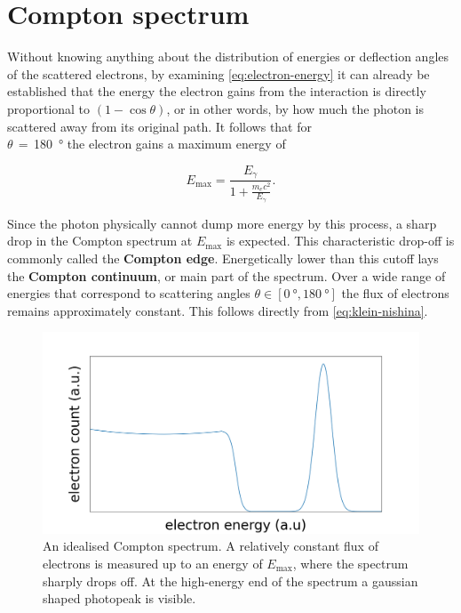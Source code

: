 
\section{Compton spectrum}
\label{sec:compton-spectrum}

Without knowing anything about the distribution of energies or deflection angles of
the scattered electrons, by examining \autoref{eq:electron-energy} it can already be
established that the energy the electron gains from the interaction is directly
proportional to $\left(1-\cos\theta\right)$, or in other words, by how much the
photon is scattered away from its original path. It follows that for \\
$\theta\,=\,$\SI{180}{\degree} the electron gains a maximum energy of

\begin{equation}
\label{eq:maximal-energy}
E_\text{max}=\frac{E_\gamma}{1+\frac{m_e c^2}{E_\gamma}}.
\end{equation}

Since the photon physically cannot dump more energy by this process, a sharp drop in
the Compton spectrum at $E_\text{max}$ is expected. This characteristic drop-off is
commonly called the \textbf{Compton edge}. Energetically lower than this cutoff lays
the \textbf{Compton continuum}, or main part of the spectrum. Over a wide range of
energies that correspond to scattering angles $\theta\in[\SI{0}{\degree},\SI{180}
{\degree}]$ the flux of electrons remains approximately constant. This follows
directly from \autoref{eq:klein-nishina}.

\begin{figure}
	\includegraphics[width=1.0\textwidth]{fig/compton-spectrum}
	\caption{An idealised Compton spectrum. A relatively constant flux of
	electrons is measured up to an energy of $E_\text{max}$, where the spectrum
	sharply drops off. At the high-energy end of the spectrum a gaussian shaped
	photopeak is visible.}
	\label{fig:compton-spectrum}
\end{figure}

